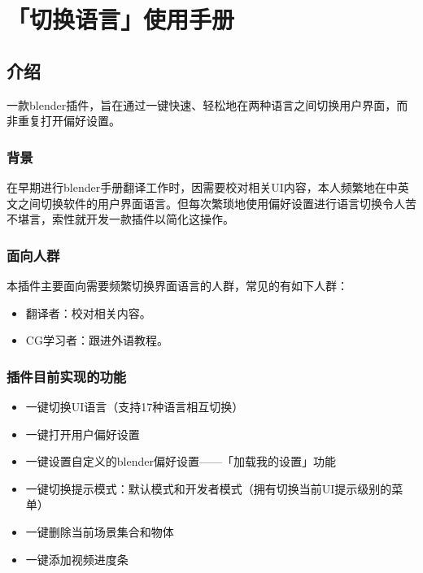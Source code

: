 \documentclass{../../public_resources/doc}
\begin{document}
\maketitle
\frontmatter
{}
{}
\mainmatter

\chapter{「切换语言」使用手册}
\section{介绍}
一款blender插件，旨在通过一键快速、轻松地在两种语言之间切换用户界面，而非重复打开偏好设置。

\subsection{背景}
在早期进行blender手册翻译工作时，因需要校对相关UI内容，本人频繁地在中英文之间切换软件的用户界面语言。但每次繁琐地使用偏好设置进行语言切换令人苦不堪言，索性就开发一款插件以简化这操作。

\subsection{面向人群}
本插件主要面向需要频繁切换界面语言的人群，常见的有如下人群：
\begin{itemize}
    \item 翻译者：校对相关内容。
    \item CG学习者：跟进外语教程。
\end{itemize}

\subsection{插件目前实现的功能}
\begin{itemize}
    \item 一键切换UI语言（支持17种语言相互切换）
    \item 一键打开用户偏好设置
    \item 一键设置自定义的blender偏好设置——「加载我的设置」功能
    \item 一键切换提示模式：默认模式和开发者模式（拥有切换当前UI提示级别的菜单）
    \item 一键删除当前场景集合和物体
    \item 一键添加视频进度条
\end{itemize}

\end{document}
